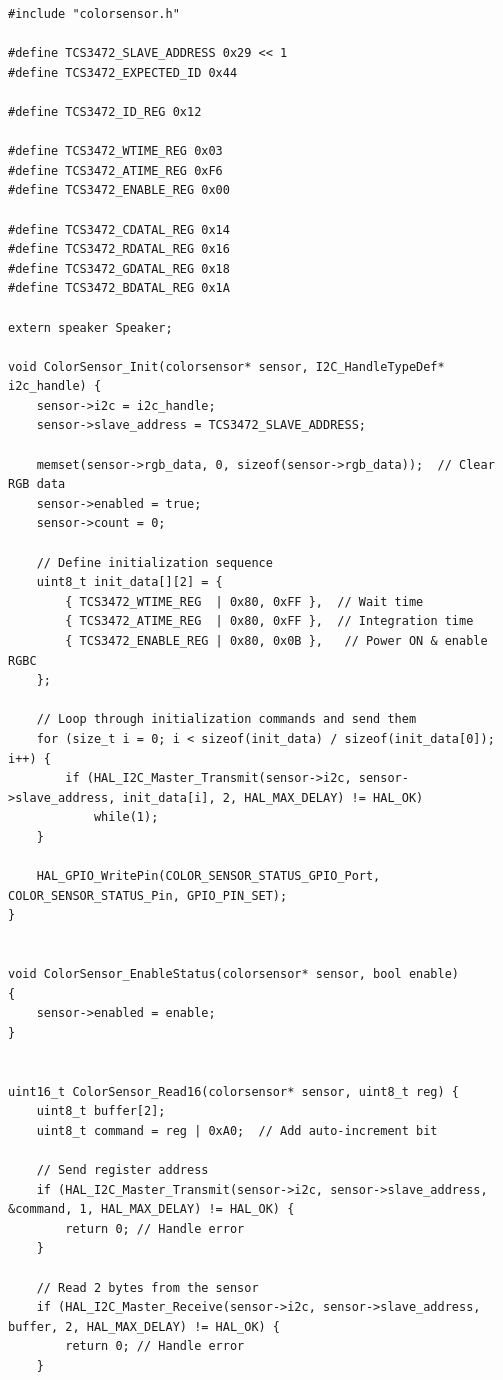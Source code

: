 \documentclass{article}
\begin{document}
\begin{lstlisting}[caption={Source Code : STM32 TCS34725 Firmware}, label={lst:stm32_colorsensor_code}]
#include "colorsensor.h"

#define TCS3472_SLAVE_ADDRESS 0x29 << 1
#define TCS3472_EXPECTED_ID 0x44

#define TCS3472_ID_REG 0x12

#define TCS3472_WTIME_REG 0x03
#define TCS3472_ATIME_REG 0xF6
#define TCS3472_ENABLE_REG 0x00

#define TCS3472_CDATAL_REG 0x14
#define TCS3472_RDATAL_REG 0x16
#define TCS3472_GDATAL_REG 0x18
#define TCS3472_BDATAL_REG 0x1A

extern speaker Speaker;

void ColorSensor_Init(colorsensor* sensor, I2C_HandleTypeDef* i2c_handle) {
    sensor->i2c = i2c_handle;
    sensor->slave_address = TCS3472_SLAVE_ADDRESS;

    memset(sensor->rgb_data, 0, sizeof(sensor->rgb_data));  // Clear RGB data
    sensor->enabled = true;
    sensor->count = 0;

    // Define initialization sequence
    uint8_t init_data[][2] = {
        { TCS3472_WTIME_REG  | 0x80, 0xFF },  // Wait time
        { TCS3472_ATIME_REG  | 0x80, 0xFF },  // Integration time
        { TCS3472_ENABLE_REG | 0x80, 0x0B },   // Power ON & enable RGBC
    };

    // Loop through initialization commands and send them
    for (size_t i = 0; i < sizeof(init_data) / sizeof(init_data[0]); i++) {
        if (HAL_I2C_Master_Transmit(sensor->i2c, sensor->slave_address, init_data[i], 2, HAL_MAX_DELAY) != HAL_OK)
        	while(1);
    }

    HAL_GPIO_WritePin(COLOR_SENSOR_STATUS_GPIO_Port, COLOR_SENSOR_STATUS_Pin, GPIO_PIN_SET);
}


void ColorSensor_EnableStatus(colorsensor* sensor, bool enable)
{
	sensor->enabled = enable;
}


uint16_t ColorSensor_Read16(colorsensor* sensor, uint8_t reg) {
    uint8_t buffer[2];
    uint8_t command = reg | 0xA0;  // Add auto-increment bit

    // Send register address
    if (HAL_I2C_Master_Transmit(sensor->i2c, sensor->slave_address, &command, 1, HAL_MAX_DELAY) != HAL_OK) {
        return 0; // Handle error
    }

    // Read 2 bytes from the sensor
    if (HAL_I2C_Master_Receive(sensor->i2c, sensor->slave_address, buffer, 2, HAL_MAX_DELAY) != HAL_OK) {
        return 0; // Handle error
    }


\end{lstlisting}
\end{document}
